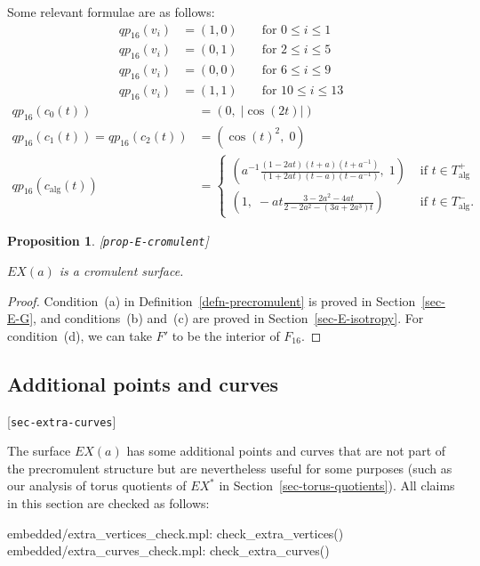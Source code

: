 \documentclass[reqno]{amsart}
\newcommand{\lbl}[1]{\label{#1}\textup{[\texttt{#1}]}\par}
\newcommand{\lbl}{\label}
\newcommand{\alg}	{\operatorname{alg}}
\renewcommand{\:}{\colon}
\newtheorem{proposition}[theorem]{Proposition}
\theoremstyle{definition}
\begin{document}
Some relevant formulae are as follows:
\begin{align*}
 qp_{16}(v_i) &= (1,0)      && \text{ for } 0\leq i \leq 1 \\
 qp_{16}(v_i) &= (0,1)      && \text{ for } 2\leq i \leq 5 \\
 qp_{16}(v_i) &= (0,0)      && \text{ for } 6\leq i \leq 9 \\
 qp_{16}(v_i) &= (1,1)      && \text{ for } 10\leq i \leq 13
\end{align*}
\begin{align*}
 qp_{16}(c_0(t)) &=\! (0,\;|\cos(2t)|) \\
 qp_{16}(c_1(t))=qp_{16}(c_2(t)) &=\! (\cos(t)^2,\;0) \\
 qp_{16}(c_{\alg}(t)) &=\! \begin{cases}
    \left(a^{-1}\frac{(1-2at)(t+a)(t+a^{-1})}{(1+2at)(t-a)(t-a^{-1})},\;1\right)
     & \text{ if } t\in T_{\alg}^+ \\
    \left(1,\;-at\frac{3-2a^2-4at}{2-2a^2-(3a+2a^3)t}\right)
     & \text{ if } t\in T_{\alg}^-.
   \end{cases}
\end{align*}

\begin{proposition}\lbl{prop-E-cromulent}
 $EX(a)$ is a cromulent surface.
\end{proposition}
\begin{proof}
 Condition~(a) in Definition~\ref{defn-precromulent} is proved in
 Section~\ref{sec-E-G}, and conditions~(b) and~(c) are
 proved in Section~\ref{sec-E-isotropy}.  For condition~(d),
 we can take $F'$ to be the interior of $F_{16}$.
\end{proof}

\subsection{Additional points and curves}
\lbl{sec-extra-curves}

The surface $EX(a)$ has some additional points and curves that are
not part of the precromulent structure but are nevertheless useful for
some purposes (such as our analysis of torus quotients of $EX^*$ in
Section~\ref{sec-torus-quotients}).  All claims in this section are checked as
follows:
\begin{checks}
 embedded/extra_vertices_check.mpl: check_extra_vertices()
 embedded/extra_curves_check.mpl: check_extra_curves()
\end{checks}
\end{document}
